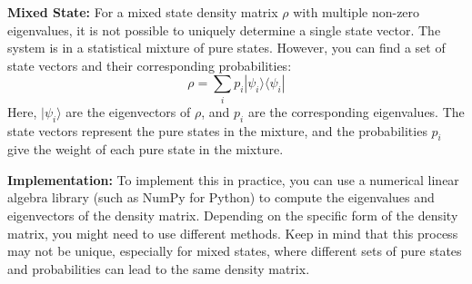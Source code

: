 \documentclass{article}
\begin{document}
\textbf{Mixed State:}
For a mixed state density matrix $\rho$ with multiple non-zero eigenvalues, it is not possible to uniquely determine a single state vector. The system is in a statistical mixture of pure states. However, you can find a set of state vectors and their corresponding probabilities:
\[ \rho = \sum_i p_i |\psi_i\rangle\langle\psi_i| \]
Here, $|\psi_i\rangle$ are the eigenvectors of $\rho$, and $p_i$ are the corresponding eigenvalues. The state vectors represent the pure states in the mixture, and the probabilities $p_i$ give the weight of each pure state in the mixture.

\textbf{Implementation:}
To implement this in practice, you can use a numerical linear algebra library (such as NumPy for Python) to compute the eigenvalues and eigenvectors of the density matrix. Depending on the specific form of the density matrix, you might need to use different methods.
Keep in mind that this process may not be unique, especially for mixed states, where different sets of pure states and probabilities can lead to the same density matrix.



\end{document}
